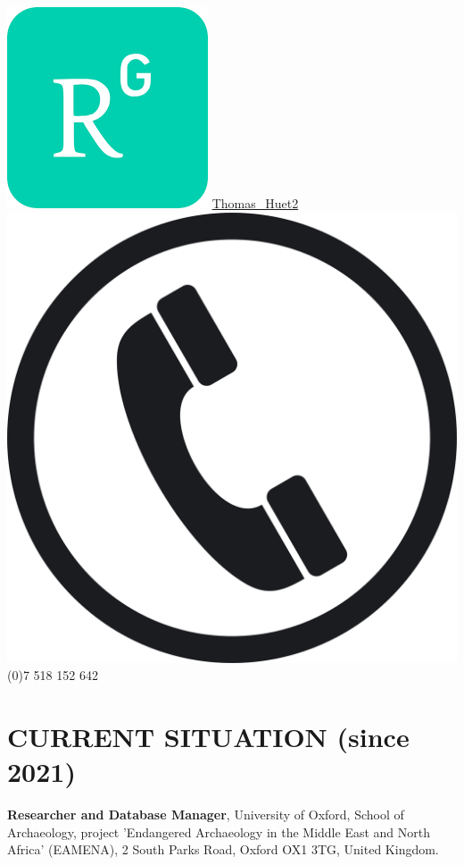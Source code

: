 \documentclass{article}
\newcommand{\fr}[1]{}       %
\newcommand{\en}[1]{#1}     %
\begin{document}
\includegraphics[scale=0.050]{rgate} \quad \href{https://www.researchgate.net/profile/Thomas\_Huet2}{Thomas\_Huet2} \\
\includegraphics[scale=0.005]{phone} \quad  {} (0)7 518 152 642 \\


\section{\fr{SITUATION ACTUELLE (depuis 2021)}\en{CURRENT SITUATION (since 2021)}}
\textbf{Researcher and Database Manager}, University of Oxford, School of Archaeology, project 'Endangered Archaeology in the Middle East and North Africa' (EAMENA), 2 South Parks Road, Oxford OX1 3TG, United Kingdom.
\end{document}
